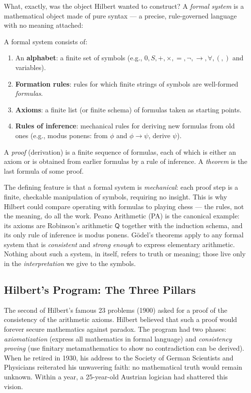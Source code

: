What, exactly, was the object Hilbert wanted to construct? A \emph{formal system} is a mathematical object made of pure syntax --- a precise, rule-governed language with no meaning attached:

\begin{definition}
A formal system consists of:
\begin{enumerate}
\item An \textbf{alphabet}: a finite set of symbols (e.g., $0, S, +, \times, =, \neg, \to, \forall, (, )$ and variables).
\item \textbf{Formation rules}: rules for which finite strings of symbols are well-formed \emph{formulas}.
\item \textbf{Axioms}: a finite list (or finite schema) of formulas taken as starting points.
\item \textbf{Rules of inference}: mechanical rules for deriving new formulas from old ones (e.g., modus ponens: from $\phi$ and $\phi \to \psi$, derive $\psi$).
\end{enumerate}
A \emph{proof} (derivation) is a finite sequence of formulas, each of which is either an axiom or is obtained from earlier formulas by a rule of inference. A \emph{theorem} is the last formula of some proof.
\end{definition}

The defining feature is that a formal system is \emph{mechanical}: each proof step is a finite, checkable manipulation of symbols, requiring no insight. This is why Hilbert could compare operating with formulas to playing chess --- the rules, not the meaning, do all the work. Peano Arithmetic (PA) is the canonical example: its axioms are Robinson's arithmetic $\mathsf{Q}$ together with the induction schema, and its only rule of inference is modus ponens. Gödel's theorems apply to any formal system that is \emph{consistent} and \emph{strong enough} to express elementary arithmetic. Nothing about such a system, in itself, refers to truth or meaning; those live only in the \emph{interpretation} we give to the symbols.

\subsection{Hilbert's Program: The Three Pillars}
\label{sec:godel:hilbert}

The second of Hilbert's famous 23 problems (1900) asked for a proof of the consistency of the arithmetic axioms. Hilbert believed that such a proof would forever secure mathematics against paradox. The program had two phases: \emph{axiomatization} (express all mathematics in formal language) and \emph{consistency proving} (use finitary metamathematics to show no contradiction can be derived). When he retired in 1930, his address to the Society of German Scientists and Physicians reiterated his unwavering faith: no mathematical truth would remain unknown. Within a year, a 25-year-old Austrian logician had shattered this vision.

